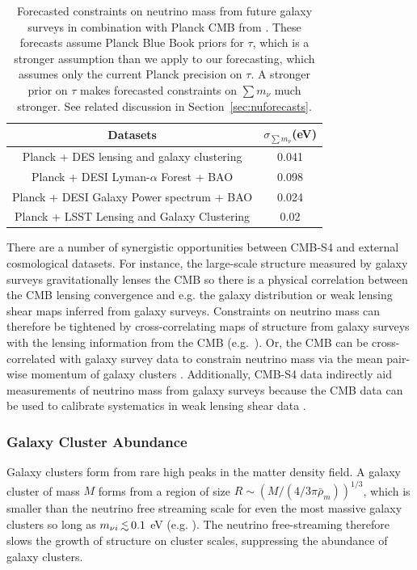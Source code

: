 \begin{table}[t!]
\begin{center}
\begin{tabular}{|c|c|} 
\hline
    				  Datasets 			& $\sigma_{\sum m_\nu}$(eV) \\
				  \hline
Planck + DES lensing and galaxy clustering 		& 			0.041		\\
\hline
Planck + DESI Lyman-$\alpha$ Forest + BAO           &			0.098		\\
\hline
Planck + DESI Galaxy Power spectrum + BAO         &			0.024		\\
\hline
Planck + LSST Lensing and Galaxy Clustering         &   0.02					\\
\hline
\end{tabular}
\caption{Forecasted constraints on neutrino mass from future galaxy surveys in combination with Planck CMB from \cite{Font-Ribera:2013rwa}.  These forecasts assume Planck Blue Book priors for $\tau$, which is a stronger assumption than we apply to our forecasting, which assumes only the current Planck precision on $\tau$. A stronger prior on $\tau$ makes forecasted constraints on $\sum m_\nu$ much stronger. See related discussion in Section~\ref{sec:nuforecasts}. }
\label{table:numassLSS}
\end{center}
\end{table}

There are a number of synergistic opportunities between CMB-S4 and external cosmological datasets. For instance, the large-scale structure measured by galaxy surveys gravitationally lenses the CMB so there is a physical correlation between the CMB lensing convergence and e.g. the galaxy distribution or weak lensing shear maps inferred from galaxy surveys. Constraints on neutrino mass can therefore be tightened by cross-correlating maps of structure from galaxy surveys with the lensing information from the CMB (e.g.\ \cite{Takeuchi:2013gpa, Pearson:2013iha}). Or, the CMB can be cross-correlated with galaxy survey data to constrain neutrino mass via the mean pair-wise momentum of galaxy clusters \cite{Mueller:2014dba}. Additionally, CMB-S4 data indirectly aid measurements of neutrino mass from galaxy surveys because the CMB data can be used to calibrate systematics in weak lensing shear data \cite{Das:2013aia}. 



\subsubsection{Galaxy Cluster Abundance}
\label{sssec:mnucluster}
Galaxy clusters form from rare high peaks in the matter density field. A galaxy cluster of mass $M$ forms from a region of size $R\sim \left(M/(4/3\pi \bar\rho_m)\right)^{1/3}$, which is smaller than the neutrino free streaming scale for even the most massive galaxy clusters so long as $m_{\nu i} \, \lsim \, 0.1$ eV (e.g. \cite{LoVerde:2013lta}). The neutrino free-streaming therefore slows the growth of structure on cluster scales, suppressing the abundance of galaxy clusters. 


